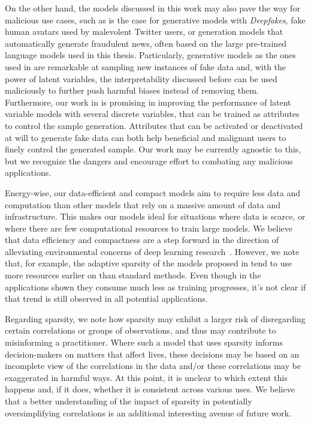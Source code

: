 On the other hand, the models discussed in this work may
also pave the way for malicious use cases, such as is the case for generative models with
\emph{Deepfakes}, fake human avatars used by malevolent Twitter
users, or generation models that automatically generate fraudulent news,
often based on the large pre-trained language models used in this thesis.
Particularly, generative models as the ones used in 
are remarkable at sampling new instances of fake data and, with the
power of latent variables, the interpretability discussed before can
be used maliciously to further push harmful biases instead of
removing them. Furthermore, our work in  is promising in improving the
performance of latent variable models with several discrete
variables, that can be trained as attributes to control the sample
generation. Attributes that can be activated or deactivated at will
to generate fake data can both help beneficial and malignant users to
finely control the generated sample. Our work may be currently
agnostic to this, but we recognize the dangers and encourage effort to
combating any malicious applications.

Energy-wise, our data-efficient and compact models aim to require
less data and computation than other models that rely on a massive
amount of data and infrastructure. This makes our models ideal for
situations where data is scarce, or where there are few computational
resources to train large models. We believe that data efficiency and
compactness are a step forward in the direction of alleviating
environmental concerns of deep learning
research~\citep{Strubell2019}. However, we note that, for
example, the adaptive sparsity of the models proposed in
 tend to use more resources earlier on
than standard methods. Even though in the applications shown
they consume much less as training progresses, it's not clear if that
trend is still observed in all potential applications.

Regarding sparsity, we note how sparsity may exhibit a larger risk of
disregarding certain correlations or groups of observations,
and thus may contribute to misinforming a practitioner.
Where such a model that uses sparsity informs decision-makers on matters that affect
lives, these decisions may be based on an incomplete view of the
correlations in the data and/or these correlations may be exaggerated
in harmful ways.
At this point, it is
unclear to which extent this happens and, if it does, whether it is
consistent across various uses. We believe that a better understanding
of the impact of sparsity in potentially oversimplifying correlations is an
additional interesting avenue of future work.


\cleardoublepage

\singlespacing